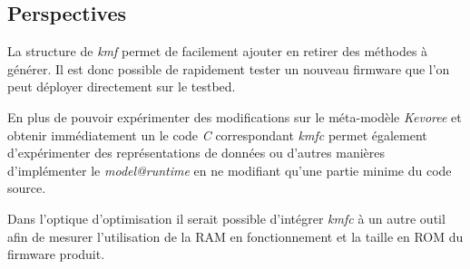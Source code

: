\subsection*{Perspectives}
{}

La structure de \emph{kmf} permet de facilement ajouter en retirer des méthodes à générer. Il est donc possible de rapidement tester un nouveau firmware que l'on peut déployer directement sur le testbed.

En plus de pouvoir expérimenter des modifications sur le méta-modèle \emph{Kevoree} et obtenir immédiatement un le code \emph{C} correspondant \emph{kmfc} permet également d'expérimenter des représentations de données ou d'autres manières d'implémenter le \emph{model@runtime} en ne modifiant qu'une partie minime du code source.


Dans l'optique d'optimisation il serait possible d'intégrer \emph{kmfc} à un autre outil afin de mesurer l'utilisation de la RAM en fonctionnement et la taille en ROM du firmware produit.